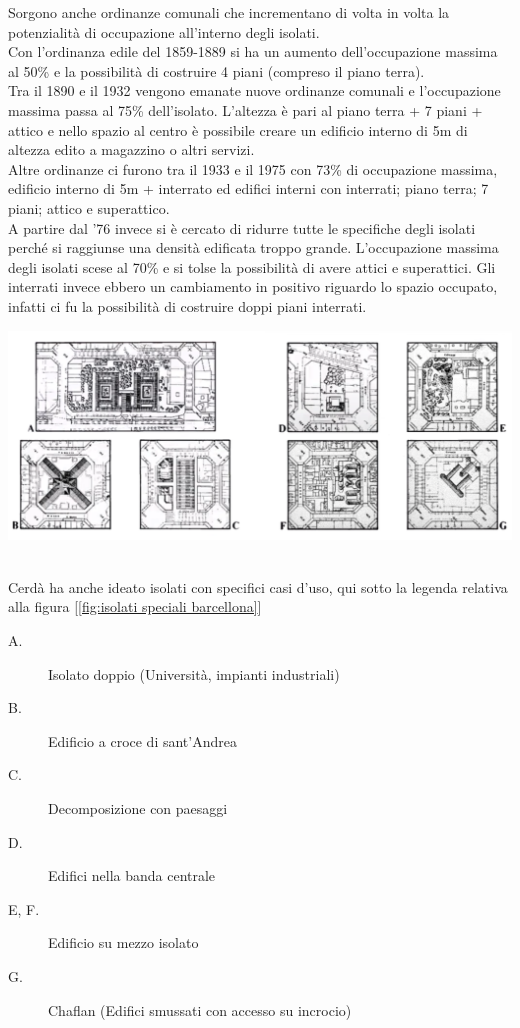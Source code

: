 \documentclass[a4paper,12pt, oneside]{book}
\begin{document}
    Sorgono anche ordinanze comunali che incrementano di volta in volta la potenzialità di occupazione all'interno degli isolati.\\
    Con l'ordinanza edile del 1859-1889 si ha un aumento dell'occupazione massima al 50\% e la possibilità di costruire 4 piani (compreso il piano terra).\\
    Tra il 1890 e il 1932 vengono emanate nuove ordinanze comunali e l'occupazione massima passa al 75\% dell'isolato. L'altezza è pari al piano terra + 7 piani + attico e nello spazio al centro è possibile creare un edificio interno di 5m di altezza edito a magazzino o altri servizi.\\
    Altre ordinanze ci furono tra il 1933 e il 1975 con 73\% di occupazione massima, edificio interno di 5m + interrato ed edifici interni con interrati; piano terra; 7 piani; attico e superattico.\\
    A partire dal '76 invece si è cercato di ridurre tutte le specifiche degli isolati perché si raggiunse una densità edificata troppo grande. L'occupazione massima degli isolati scese al 70\% e si tolse la possibilità di avere attici e superattici. Gli interrati invece ebbero un cambiamento in positivo riguardo lo spazio occupato, infatti ci fu la possibilità di costruire doppi piani interrati.\\
    \begin{center}
    	\includegraphics[width=1.0\linewidth]{"immagini/isolati speciali barcellona"}
    	\label{fig:isolati speciali barcellona}
    \end{center}
    \leavevmode\\
    Cerdà ha anche ideato isolati con specifici casi d'uso, qui sotto la legenda relativa alla figura [\ref{fig:isolati speciali barcellona}]\\
    \begin{description}
    	\item[A.    ] \phantom{a|}Isolato doppio (Università, impianti industriali)
    	\item[B.    ] \phantom{a|}Edificio a croce di sant'Andrea
    	\item[C.    ] \phantom{a|}Decomposizione con paesaggi
    	\item[D.    ] \phantom{a|}Edifici nella banda centrale
    	\item[E, F.]  \phantom{..}Edificio su mezzo isolato
    	\item[G.   ] \phantom{a|}Chaflan (Edifici smussati con accesso su incrocio)
    \end{description}
\end{document}
